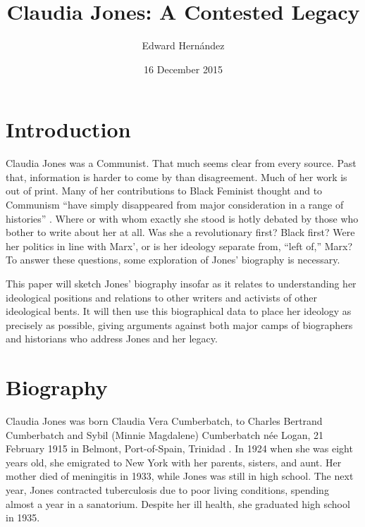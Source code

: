\documentclass[man,12pt,natbib]{apa6}
\begin{document}
\title{Claudia Jones: A Contested Legacy}
\author{Edward Hern\'{a}ndez}
\date{16 December 2015}
\maketitle


\section{Introduction}

Claudia Jones was a Communist. That much seems clear from every
source. Past that, information is harder to come by than disagreement.
Much of her work is out of print. Many of her contributions to Black
Feminist thought and to Communism ``have simply disappeared from major
consideration in a range of histories'' \citep[Ch.~1]{Davies11}. Where
or with whom exactly she stood is hotly debated by those who bother to
write about her at all. Was she a revolutionary first? Black first?
Were her politics in line with Marx', or is her ideology separate
from, ``left of,'' \citep{Davies11} Marx?  To answer these questions,
some exploration of Jones' biography is necessary.

This paper will sketch Jones' biography insofar as it relates to
understanding her ideological positions and relations to other writers and
activists of other ideological bents. It will then use this biographical data
to place her ideology as precisely as possible, giving arguments against both
major camps of biographers and historians who address Jones and her legacy.

\section{Biography}

Claudia Jones was born Claudia Vera Cumberbatch, to Charles Bertrand
Cumberbatch and Sybil (Minnie Magdalene) Cumberbatch n{\'{e}}e Logan, 21
February 1915 in Belmont, Port-of-Spain, Trinidad
\citep[Chronology~section]{Davies08}. In 1924 when she was eight years old, she
emigrated to New York with her parents, sisters, and aunt. Her mother died of
meningitis in 1933, while Jones was still in high school. The next year, Jones
contracted tuberculosis due to poor living conditions, spending almost a year
in a sanatorium. Despite her ill health, she graduated high school in 1935.
\end{document}
